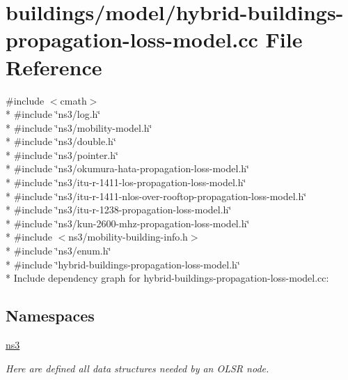 \hypertarget{hybrid-buildings-propagation-loss-model_8cc}{}\section{buildings/model/hybrid-\/buildings-\/propagation-\/loss-\/model.cc File Reference}
\label{hybrid-buildings-propagation-loss-model_8cc}
{\ttfamily \#include $<$cmath$>$}\\*
{\ttfamily \#include \char`\"{}ns3/log.\+h\char`\"{}}\\*
{\ttfamily \#include \char`\"{}ns3/mobility-\/model.\+h\char`\"{}}\\*
{\ttfamily \#include \char`\"{}ns3/double.\+h\char`\"{}}\\*
{\ttfamily \#include \char`\"{}ns3/pointer.\+h\char`\"{}}\\*
{\ttfamily \#include \char`\"{}ns3/okumura-\/hata-\/propagation-\/loss-\/model.\+h\char`\"{}}\\*
{\ttfamily \#include \char`\"{}ns3/itu-\/r-\/1411-\/los-\/propagation-\/loss-\/model.\+h\char`\"{}}\\*
{\ttfamily \#include \char`\"{}ns3/itu-\/r-\/1411-\/nlos-\/over-\/rooftop-\/propagation-\/loss-\/model.\+h\char`\"{}}\\*
{\ttfamily \#include \char`\"{}ns3/itu-\/r-\/1238-\/propagation-\/loss-\/model.\+h\char`\"{}}\\*
{\ttfamily \#include \char`\"{}ns3/kun-\/2600-\/mhz-\/propagation-\/loss-\/model.\+h\char`\"{}}\\*
{\ttfamily \#include $<$ns3/mobility-\/building-\/info.\+h$>$}\\*
{\ttfamily \#include \char`\"{}ns3/enum.\+h\char`\"{}}\\*
{\ttfamily \#include \char`\"{}hybrid-\/buildings-\/propagation-\/loss-\/model.\+h\char`\"{}}\\*
Include dependency graph for hybrid-\/buildings-\/propagation-\/loss-\/model.cc\+:
\subsection*{Namespaces}
\begin{DoxyCompactItemize}
\item 
 \hyperlink{namespacens3}{ns3}
\begin{DoxyCompactList}\small\item\em Here are defined all data structures needed by an O\+L\+SR node. \end{DoxyCompactList}\end{DoxyCompactItemize}

